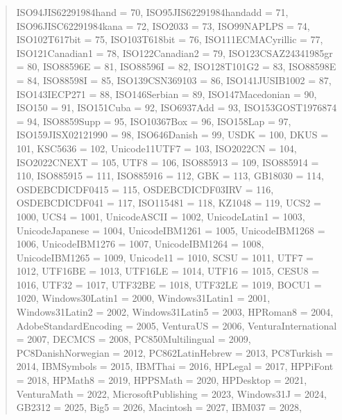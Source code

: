 \documentclass{wg21}
\begin{document}
\begin{quote}
\begin{addedblock}
\begin{codeblock}
{{{        ISO94JIS62291984hand = 70,
        ISO95JIS62291984handadd = 71,
        ISO96JISC62291984kana = 72,
        ISO2033 = 73,
        ISO99NAPLPS = 74,
        ISO102T617bit = 75,
        ISO103T618bit = 76,
        ISO111ECMACyrillic = 77,
        ISO121Canadian1 = 78,
        ISO122Canadian2 = 79,
        ISO123CSAZ24341985gr = 80,
        ISO88596E = 81,
        ISO88596I = 82,
        ISO128T101G2 = 83,
        ISO88598E = 84,
        ISO88598I = 85,
        ISO139CSN369103 = 86,
        ISO141JUSIB1002 = 87,
        ISO143IECP271 = 88,
        ISO146Serbian = 89,
        ISO147Macedonian = 90,
        ISO150 = 91,
        ISO151Cuba = 92,
        ISO6937Add = 93,
        ISO153GOST1976874 = 94,
        ISO8859Supp = 95,
        ISO10367Box = 96,
        ISO158Lap = 97,
        ISO159JISX02121990 = 98,
        ISO646Danish = 99,
        USDK = 100,
        DKUS = 101,
        KSC5636 = 102,
        Unicode11UTF7 = 103,
        ISO2022CN = 104,
        ISO2022CNEXT = 105,
        UTF8 = 106,
        ISO885913 = 109,
        ISO885914 = 110,
        ISO885915 = 111,
        ISO885916 = 112,
        GBK = 113,
        GB18030 = 114,
        OSDEBCDICDF0415 = 115,
        OSDEBCDICDF03IRV = 116,
        OSDEBCDICDF041 = 117,
        ISO115481 = 118,
        KZ1048 = 119,
        UCS2 = 1000,
        UCS4 = 1001,
        UnicodeASCII = 1002,
        UnicodeLatin1 = 1003,
        UnicodeJapanese = 1004,
        UnicodeIBM1261 = 1005,
        UnicodeIBM1268 = 1006,
        UnicodeIBM1276 = 1007,
        UnicodeIBM1264 = 1008,
        UnicodeIBM1265 = 1009,
        Unicode11 = 1010,
        SCSU = 1011,
        UTF7 = 1012,
        UTF16BE = 1013,
        UTF16LE = 1014,
        UTF16 = 1015,
        CESU8 = 1016,
        UTF32 = 1017,
        UTF32BE = 1018,
        UTF32LE = 1019,
        BOCU1 = 1020,
        Windows30Latin1 = 2000,
        Windows31Latin1 = 2001,
        Windows31Latin2 = 2002,
        Windows31Latin5 = 2003,
        HPRoman8 = 2004,
        AdobeStandardEncoding = 2005,
        VenturaUS = 2006,
        VenturaInternational = 2007,
        DECMCS = 2008,
        PC850Multilingual = 2009,
        PC8DanishNorwegian = 2012,
        PC862LatinHebrew = 2013,
        PC8Turkish = 2014,
        IBMSymbols = 2015,
        IBMThai = 2016,
        HPLegal = 2017,
        HPPiFont = 2018,
        HPMath8 = 2019,
        HPPSMath = 2020,
        HPDesktop = 2021,
        VenturaMath = 2022,
        MicrosoftPublishing = 2023,
        Windows31J = 2024,
        GB2312 = 2025,
        Big5 = 2026,
        Macintosh = 2027,
        IBM037 = 2028,
}}}
\end{codeblock}
\end{addedblock}
\end{quote}
\end{document}
